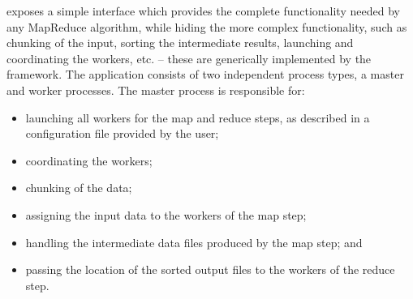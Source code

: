 \documentclass[3p,twocolumn]{elsarticle}
\begin{document}


\smr exposes a simple interface which provides the complete
functionality needed by any MapReduce algorithm, while hiding the more
complex functionality, such as chunking of the input, sorting the
intermediate results, launching and coordinating the workers, etc. --
these are generically implemented by the framework.  The application
consists of two independent process types, a master and worker processes.
The master process is responsible for:

\begin{itemize}
 \vspace*{-0.5em}
 \setlength{\itemsep}{-.1em}


 \item launching all workers for the map and reduce steps, as
 described in a configuration file provided by the user; 
 \item coordinating the workers;
 \item chunking of the data;
 \item assigning the
 input data to the workers of the map step;
 \item handling the intermediate
 data files produced by the map step; and
 \item passing the location of the
 sorted output files to the workers of the reduce step.


 \vspace*{-0.5em}
\end{itemize}
\end{document}
